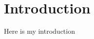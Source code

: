 
\chapter*{Introduction}
\ifpdf
    \graphicspath{{Chapter1/Figs/Raster/}{Chapter1/Figs/PDF/}{Chapter1/Figs/}}
\else
    \graphicspath{{Chapter1/Figs/Vector/}{Chapter1/Figs/}}
\fi
Here is my introduction


